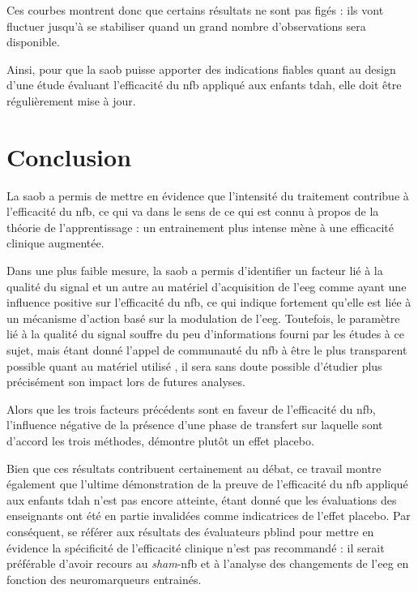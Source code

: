 Ces courbes montrent donc que certains résultats ne sont pas figés : ils vont fluctuer jusqu'à se stabiliser quand un grand nombre d'observations sera disponible. 

Ainsi, pour que la \gls{saob} puisse apporter des indications fiables quant au design d'une étude évaluant l'efficacité du \gls{nfb} appliqué aux enfants \gls{tdah}, elle doit être 
régulièrement mise à jour. 

\section{Conclusion} \label{conclusion_saob}

La \gls{saob} a permis de mettre en évidence que l'intensité du traitement contribue à l'efficacité du \gls{nfb}, ce qui va dans le sens de ce qui est connu à propos de 
la théorie de l'apprentissage \citep{Mowrer1960} : un entrainement plus intense mène à une efficacité clinique augmentée. 

Dans une plus faible mesure, la \gls{saob} a permis d'identifier un facteur lié à la qualité du signal et un autre au matériel d'acquisition de l'\gls{eeg} comme ayant une influence positive 
sur l'efficacité du \gls{nfb}, ce qui indique fortement qu'elle est liée à un mécanisme d'action basé sur la modulation de l'\gls{eeg}. Toutefois, le paramètre lié à la qualité du signal 
souffre du peu d'informations fourni par les études à ce sujet, mais étant donné l'appel de
communauté du \gls{nfb} à être le plus transparent possible quant au matériel utilisé \citep{Ros2019}, il sera sans doute possible d'étudier plus précisément
son impact lors de futures analyses.

Alors que les trois facteurs précédents sont en faveur de l'efficacité du \gls{nfb}, l'influence négative de la présence d'une phase de transfert sur laquelle sont d'accord les trois méthodes, 
démontre plutôt un effet placebo. 

Bien que ces résultats contribuent certainement au débat, ce travail montre également que l'ultime démonstration de la preuve de l'efficacité du \gls{nfb}
appliqué aux enfants \gls{tdah} n'est pas encore atteinte, étant donné que les évaluations des enseignants ont été en partie invalidées comme indicatrices de 
l'effet placebo. Par conséquent, se référer aux résultats des évaluateurs \gls{pblind} pour mettre en évidence la spécificité de l'efficacité clinique n'est pas 
recommandé : il serait préférable d'avoir recours au \textit{sham}-\gls{nfb} et à l'analyse des changements de l'\gls{eeg} en fonction des neuromarqueurs entrainés.

